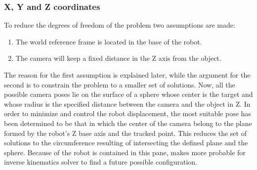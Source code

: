 	\subsubsection{X, Y and Z coordinates} %
	\label{subsub:x_y_and_z_coordinates}
	To reduce the degrees of freedom of the problem two assumptions are made:
	\begin{enumerate}
		\item The world reference frame is located in the base of the robot.
		\item The camera will keep a fixed distance in the Z axis from the object.
	\end{enumerate}
	The reason for the first assumption is explained later, while the argument for the second is to constrain the problem to a smaller set of solutions. 
	Now, all the possible camera poses lie on the surface of a sphere whose center is the target and whose radius is the specified distance between the camera and the object in Z.
	In order to minimize and control the robot displacement, the most suitable pose has been determined to be that in which the center of the camera belong to the plane formed by the robot's Z base axis and the tracked point. 
	This reduces the set of solutions to the circumference resulting of intersecting the defined plane and the sphere.
	Because of the robot is contained in this pane, makes more probable for inverse kinematics solver to find a future possible configuration.\\

